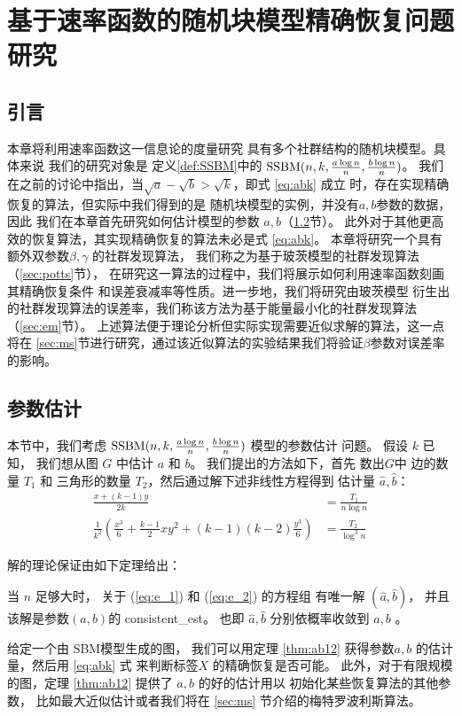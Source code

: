 
\chapter{基于速率函数的随机块模型精确恢复问题研究}\label{chap:sibm}
\section{引言}
本章将利用速率函数这一信息论的度量研究
具有多个社群结构的随机块模型。具体来说
我们的研究对象是
定义\ref{def:SSBM}中的 $\operatorname{SSBM}(n,k,\frac{a \log n}{n}, \frac{b \log n}{n})$。
我们在之前的讨论中指出，当$\sqrt{a}-\sqrt{b}>\sqrt{k}$，即式 \eqref{eq:abk} 成立
时，存在实现精确恢复的算法，但实际中我们得到的是
随机块模型的实例，并没有$a,b$参数的数据，因此
我们在本章首先研究如何估计模型的参数 $a,b$（\ref{sec:parameter_estimation}节）。
此外对于其他更高效的恢复算法，其实现精确恢复的算法未必是式 \eqref{eq:abk}。
本章将研究一个具有额外双参数$\beta,\gamma$ 的社群发现算法，
我们称之为基于玻茨模型的社群发现算法（\ref{sec:potts}节），
在研究这一算法的过程中，我们将展示如何利用速率函数刻画其精确恢复条件
和误差衰减率等性质。进一步地，我们将研究由玻茨模型
衍生出的社群发现算法的误差率，我们称该方法为基于能量最小化的社群发现算法（\ref{sec:em}节）。
上述算法便于理论分析但实际实现需要近似求解的算法，这一点将在
\ref{sec:ms}节进行研究，通过该近似算法的实验结果我们将验证$\beta$参数对误差率的影响。
\section{参数估计}\label{sec:parameter_estimation}

本节中，我们考虑 $\operatorname{SSBM}(n,k,\frac{a \log n}{n}, \frac{b \log n}{n})$ 模型的参数估计
问题。
假设 $k$ 已知，
我们想从图 $G$ 中估计
$a$ 和 $b$。
我们提出的方法如下，首先
数出$G$中 边的数量 $T_1$ 
和 三角形的数量
$T_2$，然后通过解下述非线性方程得到
估计量 $\hat{a}, \hat{b}$：
\begin{align}
\frac{x+(k-1)y}{2k} & = \frac{T_1}{n\log n} \label{eq:e_1}\\
\frac{1}{k^2}
\left(\frac{x^3}{6} + \frac{k-1}{2}xy^2 + (k-1)(k-2)\frac{y^3}{6}\right) & = \frac{T_2}{\log^3 n} \label{eq:e_2}
\end{align}

解的理论保证由如下定理给出：
\begin{theorem}\label{thm:ab12}
当 $n$ 足够大时，
关于 (\ref{eq:e_1}) 和
(\ref{eq:e_2}) 的方程组
有唯一解 $(\hat{a}, \hat{b})$，
并且该解是参数$(a,b)$的 \gls{consistent_est}。
也即 $\hat{a}, \hat{b}$ 
分别依概率收敛到 $a,b$ 。
\end{theorem}
给定一个由 SBM模型生成的图，
我们可以用定理
\ref{thm:ab12} 获得参数$a,b$ 
的估计量，然后用 \eqref{eq:abk}
式
来判断标签$X$ 的精确恢复是否可能。
此外，对于有限规模的图，定理 \ref{thm:ab12} 
提供了 $a,b$ 的好的估计用以
初始化某些恢复算法的其他参数，
比如最大近似估计或者我们将在
\ref{sec:ms} 节介绍的梅特罗波利斯算法。

